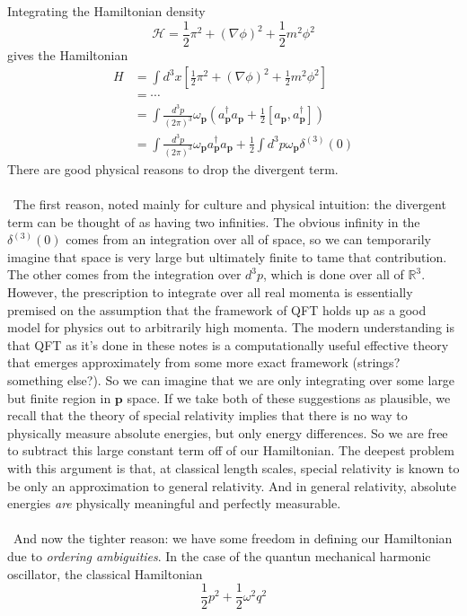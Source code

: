 \documentclass[12 pt]{article}
\newcommand{\R}{\mathbb{R}}
\newcommand{\B}[1]{\mathbf{#1}}
\newcommand{\LP}{\left(}
\newcommand{\RP}{\right)}
\numberwithin{equation}{section}
\begin{document}
Integrating the Hamiltonian density \begin{equation*}
\mathcal{H} = \frac{1}{2} \pi^2 + (\nabla \phi)^2 + \frac{1}{2} m^2 \phi^2
\end{equation*}
gives the Hamiltonian \begin{align*}
H & = \int d^3 x \left[  \frac{1}{2} \pi^2 + (\nabla \phi)^2 + \frac{1}{2} m^2 \phi^2 \right] \\
\ & = \cdots \\
\ & = \int \frac{d^3 p}{(2 \pi)^3} \omega_{\B{p}} \LP a_{\B{p}}^\dagger a_{\B{p}} + \frac{1}{2} \left[ a_{\B{p}}, a^\dagger _{\B{p}} \right] \RP \\
\ & = \int \frac{d^3 p}{(2 \pi)^3} \omega_{\B{p}} a_{\B{p}}^\dagger a_{\B{p}} + \frac{1}{2} \int d^3p \omega_\B{p} \delta^{(3)}(0)
\end{align*}
There are good physical reasons to drop the divergent term.\\
\\
\
The first reason, noted mainly for culture and physical intuition: the divergent term can be thought of as having two infinities. The obvious infinity in the $\delta^{(3)}(0)$ comes from an integration over all of space, so we can temporarily imagine that space is very large but ultimately finite to tame that contribution. The other comes from the integration over $d^3 p$, which is done over all of $\R^3$. However, the prescription to integrate over all real momenta is essentially premised on the assumption that the framework of QFT holds up as a good model for physics out to arbitrarily high momenta. The modern understanding is that QFT as it's done in these notes is a computationally useful effective theory that emerges approximately from some more exact framework (strings? something else?). So we can imagine that we are only integrating over some large but finite region in $\B{p}$ space. If we take both of these suggestions as plausible, we recall that the theory of special relativity implies that there is no way to physically measure absolute energies, but only energy differences. So we are free to subtract this large constant term off of our Hamiltonian. The deepest problem with this argument is that, at classical length scales, special relativity is known to be only an approximation to general relativity. And in general relativity, absolute energies \textit{are} physically meaningful and perfectly measurable.\\
\\
\
And now the tighter reason: we have some freedom in defining our Hamiltonian due to \textit{ordering ambiguities}. In the case of the quantun mechanical harmonic oscillator, the classical Hamiltonian \begin{equation*}
\frac{1}{2} p^2 + \frac{1}{2} \omega^2 q^2
\end{equation*}
\end{document}
